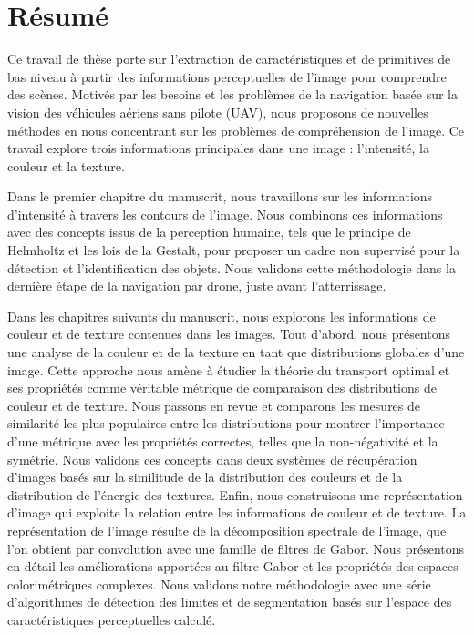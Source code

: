 \chapter*{Résumé}

\noindent Ce travail de thèse porte sur l'extraction de caractéristiques et de primitives de bas niveau à partir des informations perceptuelles de l'image pour comprendre des scènes. Motivés par les besoins et les problèmes de la navigation basée sur la vision des véhicules aériens sans pilote (UAV), nous proposons de nouvelles méthodes en nous concentrant sur les problèmes de compréhension de l'image. Ce travail explore trois informations principales dans une image : l'intensité, la couleur et la texture.
\newline 

\noindent Dans le premier chapitre du manuscrit, nous travaillons sur les informations d'intensité à travers les contours de l'image. Nous combinons ces informations avec des concepts issus de la perception humaine, tels que le principe de Helmholtz et les lois de la Gestalt, pour proposer un cadre non supervisé pour la détection et l'identification des objets. Nous validons cette méthodologie dans la dernière étape de la navigation par drone, juste avant l'atterrissage.
\newline 

\noindent Dans les chapitres suivants du manuscrit, nous explorons les informations de couleur et de texture contenues dans les images. Tout d'abord, nous présentons une analyse de la couleur et de la texture en tant que distributions globales d'une image. Cette approche nous amène à étudier la théorie du transport optimal et ses propriétés comme véritable métrique de comparaison des distributions de couleur et de texture. Nous passons en revue et comparons les mesures de similarité les plus populaires entre les distributions pour montrer l'importance d'une métrique avec les propriétés correctes, telles que la non-négativité et la symétrie. Nous validons ces concepts dans deux systèmes de récupération d'images basés sur la similitude de la distribution des couleurs et de la distribution de l'énergie des textures.
\noindent Enfin, nous construisons une représentation d'image qui exploite la relation entre les informations de couleur et de texture. La représentation de l'image résulte de la décomposition spectrale de l'image, que l'on obtient par convolution avec une famille de filtres de Gabor. Nous présentons en détail les améliorations apportées au filtre Gabor et les propriétés des espaces colorimétriques complexes. Nous validons notre méthodologie avec une série d'algorithmes de détection des limites et de segmentation basés sur l'espace des caractéristiques perceptuelles calculé.

